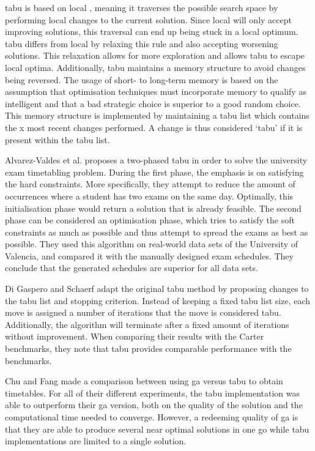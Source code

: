 \acrfull{tabu} \cite{glover1993} is based on \acrfull{local} \cite{lin1973}, meaning it traverses the possible search space by performing local changes to the current solution. Since \acrshort{local} will only accept improving solutions, this traversal can end up being stuck in a local optimum. \acrshort{tabu} differs from \acrshort{local} by relaxing this rule and also accepting worsening solutions. This relaxation allows for more exploration and allows \acrshort{tabu} to escape local optima. Additionally, \acrshort{tabu} maintains a memory structure to avoid changes being reversed. The usage of short- to long-term memory is  based on the assumption that optimisation techniques must incorporate memory to qualify as intelligent and that a bad strategic choice is superior to a good random choice\cite{glover1999}. This memory structure is implemented by maintaining a tabu list which contains the x most recent changes performed. A change is thus considered ‘tabu’ if it is present within the tabu list.

Alvarez-Valdes et al. \cite{alvarez1997} proposes a two-phased \acrlong{tabu} in order to solve the university exam timetabling problem. During
the first phase, the emphasis is on satisfying the hard constraints. More specifically, they attempt to reduce the amount of occurrences where a student has two exams on the same day. Optimally, this initialisation phase would return a solution that is already feasible. The second phase can be considered an optimisation phase, which tries to satisfy the soft constraints as much as possible and thus attempt to spread the exams as best as possible. They used this algorithm on real-world data sets of the University of Valencia, and compared it with the manually designed exam schedules. They conclude that the generated schedules are superior for all data sets.

Di Gaspero and Schaerf \cite{gaspero2001} adapt the original \acrshort{tabu} method by proposing changes to the tabu list and stopping criterion. Instead of keeping a fixed tabu list size, each move is assigned a number of iterations that the move is considered tabu. Additionally, the algorithm will terminate after a fixed amount of iterations without improvement. When comparing their results with the Carter benchmarks, they note that \acrlong{tabu} provides comparable performance with the benchmarks.

Chu and Fang \cite{Chu2000} made a comparison between using \acrlong{ga} versus \acrlong{tabu} to obtain timetables. For all of their different experiments, the \acrfull{tabu} implementation was able to outperform their \acrshort{ga} version, both on the quality of the solution and the computational time needed to converge. However, a redeeming quality of \acrlong{ga} is that they are able to produce several near optimal solutions in one go while \acrlong{tabu} implementations are limited to a single solution. 

